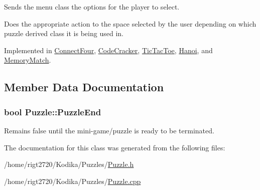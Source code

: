 Sends the menu class the options for the player to select. 

Does the appropriate action to the space selected by the user depending on which puzzle derived class it is being used in. 

Implemented in \hyperlink{classConnectFour_a58bd5328672a5c6d95fde740a4131eeb}{Connect\-Four}, \hyperlink{classCodeCracker_acbbd890be17cec27b879eb369de82017}{Code\-Cracker}, \hyperlink{classTicTacToe_a5fd34a83c96edbcf3c3c5a0930d513fb}{Tic\-Tac\-Toe}, \hyperlink{classHanoi_a4dd4c6028ade2b265ce98e48c3f2fb2a}{Hanoi}, and \hyperlink{classMemoryMatch_a62548d6cf028d372c08cc01a0693edb2}{Memory\-Match}.



\subsection{Member Data Documentation}
\hypertarget{classPuzzle_a965ad54e9f7340c3cad944fc82c61a2b}{
\subsubsection[{Puzzle\-End}]{\setlength{\rightskip}{0pt plus 5cm}bool Puzzle\-::\-Puzzle\-End}}\label{classPuzzle_a965ad54e9f7340c3cad944fc82c61a2b}


Remains false until the mini-\/game/puzzle is ready to be terminated. 



The documentation for this class was generated from the following files\-:\begin{DoxyCompactItemize}
\item 
/home/rigt2720/\-Kodika/\-Puzzles/\hyperlink{Puzzle_8h}{Puzzle.\-h}\item 
/home/rigt2720/\-Kodika/\-Puzzles/\hyperlink{Puzzle_8cpp}{Puzzle.\-cpp}\end{DoxyCompactItemize}
